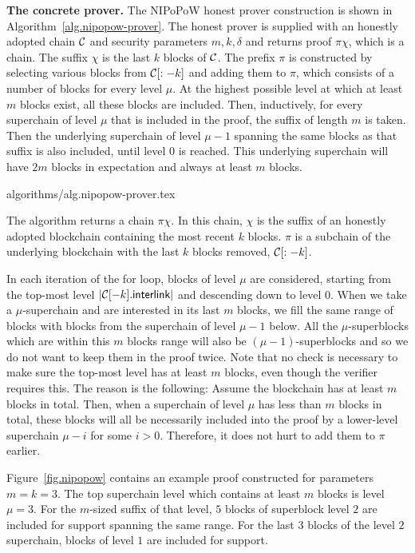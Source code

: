 \noindent
\textbf{The concrete prover.}
The NIPoPoW honest prover construction is shown in
Algorithm~\ref{alg.nipopow-prover}. The honest prover is supplied with an
honestly adopted chain $\mathcal{C}$ and security parameters $m, k, \delta$ and
returns proof $\pi\chi$, which is a chain. The suffix $\chi$ is the last $k$
blocks of $\mathcal{C}$. The prefix $\pi$ is constructed by selecting various blocks
from $\mathcal{C}[:-k]$ and adding them to $\pi$, which consists of a number of
blocks for every level $\mu$. At the highest possible level at which at least
$m$ blocks exist, all these blocks are included. Then, inductively, for every
superchain of level $\mu$ that is included in the proof, the suffix of length
$m$ is taken. Then the underlying superchain of level $\mu - 1$ spanning the
same blocks as that suffix is also included, until level $0$ is reached. This
underlying superchain will have $2m$ blocks in expectation and always at least
$m$ blocks.

{algorithms/alg.nipopow-prover.tex}

The algorithm returns a chain $\pi\chi$. In this chain, $\chi$ is the suffix of
an honestly adopted blockchain containing the most recent $k$ blocks. $\pi$ is a
subchain of the underlying blockchain with the last $k$ blocks removed,
$\mathcal{C}[:-k]$.

In each iteration of the for loop, blocks of level $\mu$ are considered,
starting from the top-most level $|\mathcal{C}[-k].\textsf{interlink}|$ and
descending down to level $0$. When we take a $\mu$-superchain and are interested
in its last $m$ blocks, we fill the same range of blocks with blocks from the
superchain of level $\mu - 1$ below. All the $\mu$-superblocks which are within
this $m$ blocks range will also be $(\mu-1)$-superblocks and so we do not want
to keep them in the proof twice. Note that no check is necessary to make sure
the top-most level has at least $m$ blocks, even though the verifier requires
this. The reason is the following: Assume the blockchain has at least $m$ blocks
in total. Then, when a superchain of level $\mu$ has less than $m$ blocks in
total, these blocks will all be necessarily included into the proof by a
lower-level superchain $\mu - i$ for some $i > 0$. Therefore, it does not hurt
to add them to $\pi$ earlier.

Figure~\ref{fig.nipopow} contains an example proof constructed for parameters
$m = k = 3$. The top superchain level which contains at least $m$ blocks is
level $\mu = 3$. For the $m$-sized suffix of that level, $5$ blocks of
superblock level $2$ are included for support spanning the same range. For the
last $3$ blocks of the level $2$ superchain, blocks of level $1$ are included
for support.

